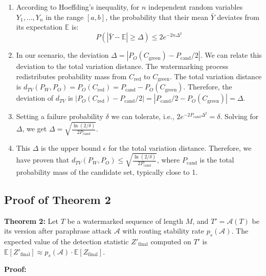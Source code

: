 \documentclass[letterpaper,twocolumn,10pt]{article}
\begin{document}
\begin{enumerate}
\item According to Hoeffding's inequality, for $n$ independent random variables $Y_1,..., Y_n$ in the range $[a,b]$, the probability that their mean $\bar{Y}$ deviates from its expectation $\mathbb{E}$ is:
$$P(|\bar{Y} - \mathbb{E}| \ge \Delta) \le 2e^{-2n\Delta^2}$$

\item In our scenario, the deviation $\Delta = |P_O(C_{\text{green}}) - P_{\text{cand}}/2|$. We can relate this deviation to the total variation distance. The watermarking process redistributes probability mass from $C_{\text{red}}$ to $C_{\text{green}}$. The total variation distance is $d_{TV}(P_W, P_O) = P_O(C_{\text{red}}) = P_{\text{cand}} - P_O(C_{\text{green}})$. Therefore, the deviation of $d_{TV}$ is $|P_O(C_{\text{red}}) - P_{\text{cand}}/2| = |P_{\text{cand}}/2 - P_O(C_{\text{green}})| = \Delta$.

\item Setting a failure probability $\delta$ we can tolerate, i.e., $2e^{-2P_{\text{cand}}\Delta^2} = \delta$. Solving for $\Delta$, we get $\Delta = \sqrt{\frac{\ln(2/\delta)}{2 P_{\text{cand}}}}$.

\item This $\Delta$ is the upper bound $\epsilon$ for the total variation distance. Therefore, we have proven that $d_{TV}(P_W, P_O) \le \sqrt{\frac{\ln(2/\delta)}{2 P_{\text{cand}}}}$, where $P_{\text{cand}}$ is the total probability mass of the candidate set, typically close to 1.
\end{enumerate}

\subsection{Proof of Theorem 2}

\textbf{Theorem 2:} Let $T$ be a watermarked sequence of length $M$, and $T' = \mathcal{A}(T)$ be its version after paraphrase attack $\mathcal{A}$ with routing stability rate $p_s(\mathcal{A})$. The expected value of the detection statistic $Z'_{\text{final}}$ computed on $T'$ is $\mathbb{E}[Z'_{\text{final}}] \approx p_s(\mathcal{A}) \cdot \mathbb{E}[Z_{\text{final}}]$.

\textbf{Proof:}
\end{document}
